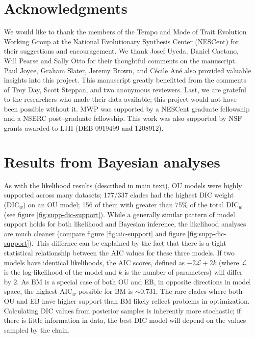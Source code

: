 \documentclass[a4paper,11pt]{article}
\begin{document}
{\section{Acknowledgments}
We would like to thank the members of the Tempo and Mode of Trait Evolution Working Group at the National Evolutionary Synthesis Center (NESCent) for their suggestions and encouragement. We thank Josef Uyeda, Daniel Caetano, Will Pearse and Sally Otto for their thoughtful comments on the manuscript. Paul Joyce, Graham Slater, Jeremy Brown, and C\'{e}cile An\'{e} also provided valuable insights into this project. This manuscript greatly benefitted from the comments of Troy Day, Scott Steppan, and two anonymous reviewers. Last, we are grateful to the researchers who made their data available; this project would not have been possible without it. MWP was supported by a NESCent graduate fellowship and a NSERC post--graduate fellowship. This work was also supported by NSF grants awarded to LJH (DEB 0919499 and 1208912).

 
\newpage



\newpage

\section{Results from Bayesian analyses}
As with the likelihood results (described in main text), OU models were highly supported across many datasets; 
177/337 clades had the highest DIC weight (DIC$_w$) on an OU model; 156 of them with greater than 75\% of the total DIC$_w$ (see figure \ref{fig:supp-dic-support}). While a generally similar pattern of model support holds for both likelihood and Bayesian inference, the likelihood analyses are much cleaner (compare figure \ref{fig:aic-support} and figure \ref{fig:supp-dic-support}). This differnce can be explained by the fact that there is a tight statistical relationship between the AIC values for these three models. If two models have identical likelihoods, the AIC scores, defined as $-2\mathcal{L} + 2k$ (where $\mathcal{L}$ is the log-likelihood of the model and $k$ is the number of parameters) will differ by $2$. As BM is a special case of both OU and EB, in opposite directions in model space, the highest AIC$_w$ possible for BM is $\sim$0.731. The rare clades where both OU and EB have higher support than BM likely reflect problems in optimization. Calculating DIC values from posterior samples is inherently more stochastic; if there is little information in data, the best DIC model will depend on the values sampled by the chain. 

}
\end{document}
